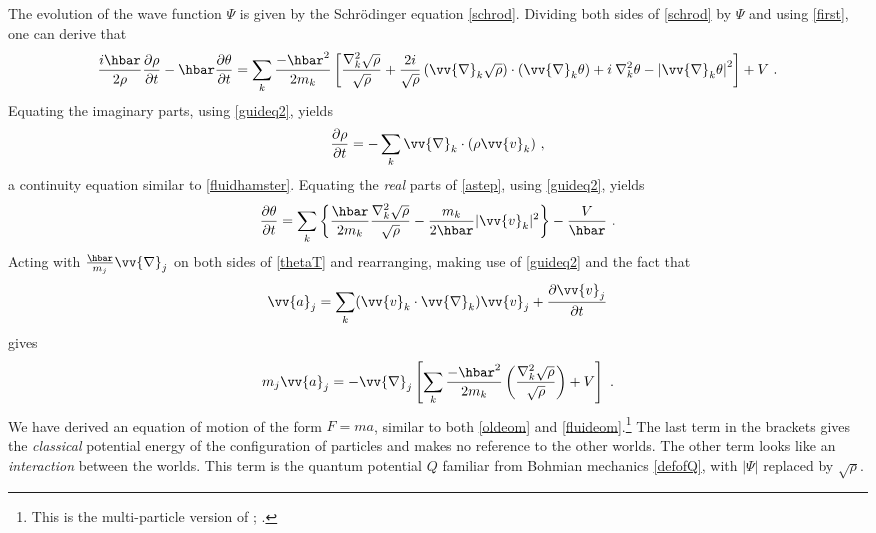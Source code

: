 \documentclass[12pt,secnumarabic,balancelastpage,amsmath,amssymb,nofootinbib]{article}
\begin{document}
The evolution of the wave function $\Psi$ is given by the Schr\"{o}dinger equation \eqref{schrod}.  Dividing both sides of \eqref{schrod} by $\Psi$ and using \eqref{first}, one can derive that
\begin{equation}
\frac{i\hbar}{2\rho}\frac{\partial\rho}{\partial t}-\hbar \frac{\partial \theta}{\partial t} = \sum_k{\frac{-\hbar^2}{2 m_k}\left[\frac{\nabla_k^2 \sqrt{\rho}}{\sqrt{\rho}}+\frac{2 i}{\sqrt{\rho}} \left(\vv{\nabla}_k \sqrt{\rho}\right)\cdot\left(\vv{\nabla}_k \theta\right) + i \: \nabla_k^2 \theta - \left|\vv{\nabla}_k \theta\right|^2\right]}+V\ .
\label{astep}
\end{equation}
Equating the imaginary parts, using \eqref{guideq2}, yields
\begin{equation}
\frac{\partial\rho}{\partial t}=-\sum_k{\vv{\nabla}_k \cdot \left(\rho\vv{v}_k\right)}\ ,
\label{hamster}
\end{equation}
a continuity equation similar to \eqref{fluidhamster}.  Equating the \emph{real} parts of \eqref{astep}, using \eqref{guideq2}, yields
\begin{equation}
\frac{\partial \theta}{\partial t}=\sum_k{\left\{\frac{\hbar}{2 m_k}\frac{\nabla_k^2 \sqrt{\rho}}{\sqrt{\rho}}-\frac{m_k}{2 \hbar}|\vv{v}_k|^2\right\}}-\frac{V}{\hbar}\ .
\label{thetaT}
\end{equation}
Acting with $\frac{\hbar}{m_j}\vv{\nabla}_j$ on both sides of \eqref{thetaT} and rearranging, making use of \eqref{guideq2} and the fact that
\begin{equation}
\vv{a}_j=\sum_k (\vv{v}_k\cdot\vv{\nabla}_k)\vv{v}_j+\frac{\partial \vv{v}_j}{\partial t}
\label{accel}
\end{equation}
gives
\begin{equation}
m_j \vv{a}_j=-\vv{\nabla}_j\left[\sum_k \frac{-\hbar^2}{2 m_k }\left(\frac{\nabla_k^2 \sqrt{\rho}}{\sqrt{\rho}}\right)+V\right]\ .
\label{eom}
\end{equation}
We have derived an equation of motion of the form $F=ma$, similar to both \eqref{oldeom} and \eqref{fluideom}.\footnote{This is the multi-particle version of \citet[][eq. 1.7]{wyatt2005}; \citet[][eq. 4.9]{holland2005}.}  The last term in the brackets gives the \emph{classical} potential energy of the configuration of particles and makes no reference to the other worlds.  The other term looks like an \emph{interaction} between the worlds. This term is the quantum potential $Q$ familiar from Bohmian mechanics \eqref{defofQ}, with $|\Psi|$ replaced by $\sqrt{\rho}$.
\end{document}
